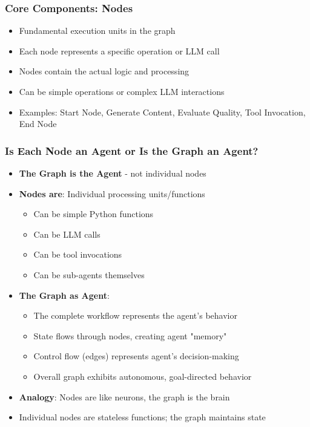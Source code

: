 \begin{frame}[fragile]\frametitle{Core Components: Nodes}
      \begin{itemize}
        \item Fundamental execution units in the graph
        \item Each node represents a specific operation or LLM call
        \item Nodes contain the actual logic and processing
        \item Can be simple operations or complex LLM interactions
        \item Examples: Start Node, Generate Content, Evaluate Quality, Tool Invocation, End Node
      \end{itemize}
\end{frame}

\begin{frame}[fragile]\frametitle{Is Each Node an Agent or Is the Graph an Agent?}
      \begin{itemize}
        \item \textbf{The Graph is the Agent} - not individual nodes
        \item \textbf{Nodes are}: Individual processing units/functions
        \begin{itemize}
            \item Can be simple Python functions
            \item Can be LLM calls
            \item Can be tool invocations
            \item Can be sub-agents themselves
        \end{itemize}
        \item \textbf{The Graph as Agent}:
        \begin{itemize}
            \item The complete workflow represents the agent's behavior
            \item State flows through nodes, creating agent "memory"
            \item Control flow (edges) represents agent's decision-making
            \item Overall graph exhibits autonomous, goal-directed behavior
        \end{itemize}
        \item \textbf{Analogy}: Nodes are like neurons, the graph is the brain
        \item Individual nodes are stateless functions; the graph maintains state
      \end{itemize}
\end{frame}

